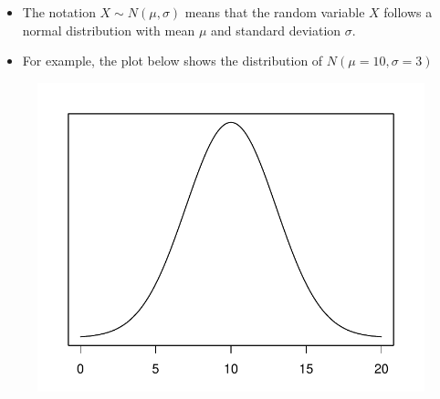 \documentclass{beamer}
\begin{document}
\begin{frame}
\begin{itemize}
\item The notation $X \sim N(\mu, \sigma)$ means that the random variable $X$ follows a normal distribution with mean $\mu$ and standard deviation $\sigma$.
\vspace{5pt}
\item For example, the plot below shows the distribution of $N(\mu = 10, \sigma = 3)$
\end{itemize}
\begin{figure}
\includegraphics[scale=0.3]{figure/norm1.pdf}
\end{figure}
\end{frame}
\end{document}
